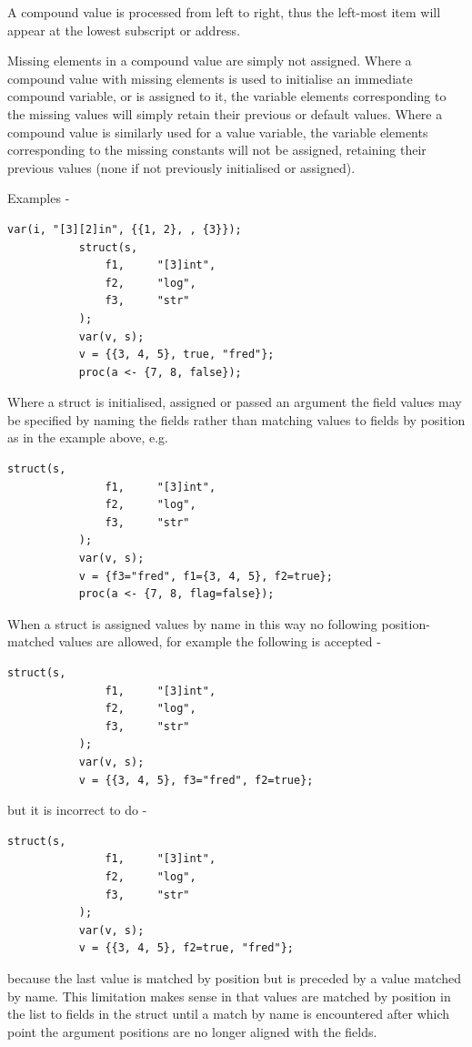         A compound value is processed from left to right, thus the left-most
        item will appear at the lowest subscript or address.
        
        Missing elements in a compound value are simply not assigned.
        Where a compound value with missing elements is used to initialise
        an immediate compound variable, or is assigned to it, the variable
        elements corresponding to the missing values will simply retain
        their previous or default values. Where a compound value is
        similarly used for a value variable, the variable elements
        corresponding to the missing constants will not be assigned, retaining
        their previous values (none if not previously initialised or assigned).

        Examples -
        \begin{lstlisting}[gobble=8, language=threepl]
           var(i, "[3][2]in", {{1, 2}, , {3}});
           struct(s,
               f1,     "[3]int",
               f2,     "log",
               f3,     "str"
           );
           var(v, s);
           v = {{3, 4, 5}, true, "fred"};
           proc(a <- {7, 8, false});
        \end{lstlisting}
        
        Where a struct is initialised, assigned or passed an argument the
        field values may be specified by naming the fields rather than matching
        values to fields by position as in the example above, e.g.
        \begin{lstlisting}[gobble=8, language=threepl]
           struct(s,
               f1,     "[3]int",
               f2,     "log",
               f3,     "str"
           );
           var(v, s);
           v = {f3="fred", f1={3, 4, 5}, f2=true};
           proc(a <- {7, 8, flag=false});
        \end{lstlisting}
        When a struct is assigned values by name in this way no following
        position-matched values are allowed, for example the following
        is accepted -
        \begin{lstlisting}[gobble=8, language=threepl]
           struct(s,
               f1,     "[3]int",
               f2,     "log",
               f3,     "str"
           );
           var(v, s);
           v = {{3, 4, 5}, f3="fred", f2=true};
        \end{lstlisting}
        but it is incorrect to do -
        \begin{lstlisting}[gobble=8, language=threepl]
           struct(s,
               f1,     "[3]int",
               f2,     "log",
               f3,     "str"
           );
           var(v, s);
           v = {{3, 4, 5}, f2=true, "fred"};
        \end{lstlisting}
        because the last value is matched by position but is preceded by
        a value matched by name. This limitation makes sense in that values
        are matched by position in the list to fields in the struct until
        a match by name is encountered after which point the argument positions
        are no longer aligned with the fields.
        
